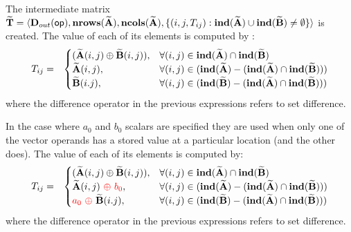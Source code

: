 The intermediate matrix ${\bf \widetilde{T}} = \langle
\mbox{$\mathbf{D}_{out}$}({\sf op}), \bold{nrows}({\bf \widetilde{A}}), \bold{ncols}({\bf \widetilde{A}}),
\{(i,j,T_{ij}) : \bold{ind}({\bf \widetilde{A}}) \cup 
\bold{ind}({\bf \widetilde{B}}) \neq \emptyset \} \rangle$
is created.  The value of each of its elements is computed by :
\begin{eqnarray*}
T_{ij} & = & 
\begin{cases}
 ({\bf \widetilde{A}}(i,j) \oplus {\bf \widetilde{B}}(i,j)),& \forall (i,j) \in \bold{ind}({\bf \widetilde{A}}) \cap \bold{ind}({\bf \widetilde{B}})\\
 {\bf \widetilde{A}}(i,j),& \forall (i,j) \in (\bold{ind}({\bf \widetilde{A}}) - (\bold{ind}({\bf \widetilde{A}}) \cap \bold{ind}({\bf \widetilde{B}})))\\
 {\bf \widetilde{B}}(i.j),& \forall (i,j) \in (\bold{ind}({\bf \widetilde{B}}) - (\bold{ind}({\bf \widetilde{A}}) \cap \bold{ind}({\bf \widetilde{B}})))
\end{cases}
\end{eqnarray*}
where the difference operator in the previous expressions refers to set difference.

In the case where $a_0$ and $b_0$ scalars are specified they are used when only
one of the vector operands has a stored value at a particular location (and the other does).  
The value of each of its elements is computed by:
\begin{eqnarray*}
T_{ij} & = & 
\begin{cases}
 ({\bf \widetilde{A}}(i,j) \oplus {\bf \widetilde{B}}(i,j)), & \forall (i,j) \in \bold{ind}({\bf \widetilde{A}}) \cap \bold{ind}({\bf \widetilde{B}})\\
 {\bf \widetilde{A}}(i,j) {\color{red} ~\oplus~ b_0}, & \forall (i,j) \in (\bold{ind}({\bf \widetilde{A}}) - (\bold{ind}({\bf \widetilde{A}}) \cap \bold{ind}({\bf \widetilde{B}})))\\
 {\color{red} a_0 ~\oplus ~}{\bf \widetilde{B}}(i.j), & \forall (i,j) \in (\bold{ind}({\bf \widetilde{B}}) - (\bold{ind}({\bf \widetilde{A}}) \cap \bold{ind}({\bf \widetilde{B}})))
\end{cases}
\end{eqnarray*}
where the difference operator in the previous expressions refers to set difference.
